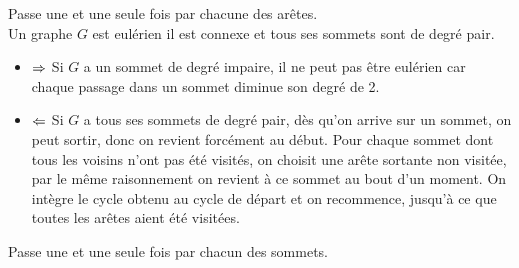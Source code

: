  Passe une et une seule fois par chacune des arêtes. \\

 Un graphe $G$ est eulérien \ssi il est connexe et tous ses sommets sont de degré pair. \\

\begin{itemize}
	\item $\Rightarrow$ Si $G$ a un sommet de degré impaire, il ne peut pas être eulérien car chaque passage dans un sommet diminue son degré de 2.
	\item $\Leftarrow$ Si $G$ a tous ses sommets de degré pair, dès qu'on arrive sur un sommet, on peut sortir, donc on revient forcément au début. Pour chaque sommet dont tous les voisins n'ont pas été visités, on choisit une arête sortante non visitée, par le même raisonnement on revient à ce sommet au bout d'un moment. On intègre le cycle obtenu au cycle de départ et on recommence, jusqu'à ce que toutes les arêtes aient été visitées.
\end{itemize}

 Passe une et une seule fois par chacun des sommets. \\
